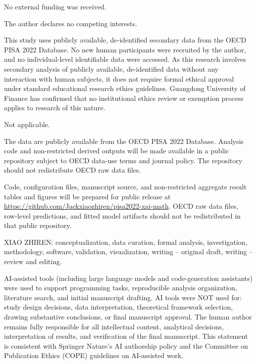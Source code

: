 \documentclass[pdflatex,sn-mathphys-ay]{sn-jnl}
\begin{document}
No external funding was received.

The author declares no competing interests.

This study uses publicly available, de-identified secondary data from the OECD PISA 2022 Database. No new human participants were recruited by the author, and no individual-level identifiable data were accessed. As this research involves secondary analysis of publicly available, de-identified data without any interaction with human subjects, it does not require formal ethical approval under standard educational research ethics guidelines. Guangdong University of Finance has confirmed that no institutional ethics review or exemption process applies to research of this nature.

Not applicable.

The data are publicly available from the OECD PISA 2022 Database. Analysis code and non-restricted derived outputs will be made available in a public repository subject to OECD data-use terms and journal policy. The repository should not redistribute OECD raw data files.

Code, configuration files, manuscript source, and non-restricted aggregate result tables and figures will be prepared for public release at \url{https://github.com/Jackxiaozhiren/pisa2022-xai-math}. OECD raw data files, row-level predictions, and fitted model artifacts should not be redistributed in that public repository.

XIAO ZHIREN: conceptualization, data curation, formal analysis, investigation, methodology, software, validation, visualization, writing -- original draft, writing -- review and editing.

AI-assisted tools (including large language models and code-generation assistants) were used to support programming tasks, reproducible analysis organization, literature search, and initial manuscript drafting. AI tools were NOT used for: study design decisions, data interpretation, theoretical framework selection, drawing substantive conclusions, or final manuscript approval. The human author remains fully responsible for all intellectual content, analytical decisions, interpretation of results, and verification of the final manuscript. This statement is consistent with Springer Nature's AI authorship policy and the Committee on Publication Ethics (COPE) guidelines on AI-assisted work.


\end{document}
